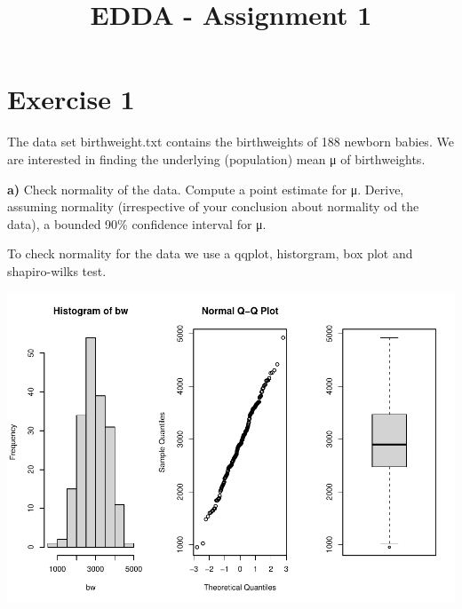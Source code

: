 \documentclass[
]{article}
\title{EDDA - Assignment 1}
\author{}
\date{\vspace{-2.5em}}
\newenvironment{Shaded}{\begin{snugshade}}{\end{snugshade}}
\newcommand{\AttributeTok}[1]{\textcolor[rgb]{0.77,0.63,0.00}{#1}}
\newcommand{\ConstantTok}[1]{\textcolor[rgb]{0.00,0.00,0.00}{#1}}
\newcommand{\DecValTok}[1]{\textcolor[rgb]{0.00,0.00,0.81}{#1}}
\newcommand{\FunctionTok}[1]{\textcolor[rgb]{0.00,0.00,0.00}{#1}}
\newcommand{\NormalTok}[1]{#1}
\newcommand{\OtherTok}[1]{\textcolor[rgb]{0.56,0.35,0.01}{#1}}
\newcommand{\SpecialCharTok}[1]{\textcolor[rgb]{0.00,0.00,0.00}{#1}}
\newcommand{\StringTok}[1]{\textcolor[rgb]{0.31,0.60,0.02}{#1}}
\begin{document}
\maketitle

\hypertarget{exercise-1}{%
\section{Exercise 1}\label{exercise-1}}

The data set birthweight.txt contains the birthweights of 188 newborn
babies. We are interested in finding the underlying (population) mean μ
of birthweights.

\textbf{a)} Check normality of the data. Compute a point estimate for μ.
Derive, assuming normality (irrespective of your conclusion about
normality od the data), a bounded 90\% confidence interval for μ.

To check normality for the data we use a qqplot, historgram, box plot
and shapiro-wilks test.

\begin{Shaded}
\end{Shaded}

\includegraphics{Assignment-1_files/figure-latex/unnamed-chunk-1-1.pdf}
\end{document}
